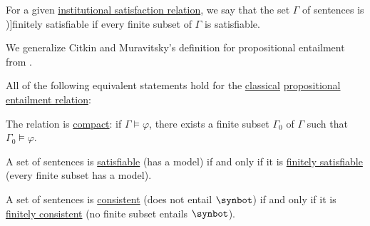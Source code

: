 \begin{definition}\label{def:finitely_satisfiable_set_of_sentences}\mimprovised
  For a given \hyperref[def:institutional_satisfaction]{institutional satisfaction relation}, we say that the set \( \Gamma \) of sentences is \term[en=finitely satisfiable (set) (\cite[117]{CitkinMuravitsky2022ConsequenceRelations})]{finitely satisfiable} if every finite subset of \( \Gamma \) is satisfiable.
\end{definition}
\begin{comments}
  \item We generalize Citkin and Muravitsky's definition for propositional entailment from \cite[def. 1.4.21]{Hinman2005Logic}.
\end{comments}

\begin{theorem}\label{thm:classical_propositional_semantic_compactness}
  All of the following equivalent statements hold for the \hyperref[def:truth_value_algebra/classical]{classical} \hyperref[def:propositional_semantics/entailment]{propositional entailment relation}:
  \begin{thmenum}
     The relation is \hyperref[def:consequence_relation/compactness]{compact}: if \( \Gamma \vDash \varphi \), there exists a finite subset \( \Gamma_0 \) of \( \Gamma \) such that \( \Gamma_0 \vDash \varphi \).

     A set of sentences is \hyperref[def:propositional_semantics/model]{satisfiable} (has a model) if and only if it is \hyperref[def:finitely_satisfiable_set_of_sentences]{finitely satisfiable} (every finite subset has a model).

     A set of sentences is \hyperref[def:propositional_theory/consistent]{consistent} (does not entail \( \synbot \)) if and only if it is \hyperref[def:finitely_consistent_set_of_sentences]{finitely consistent} (no finite subset entails \( \synbot \)).
  \end{thmenum}
\end{theorem}
